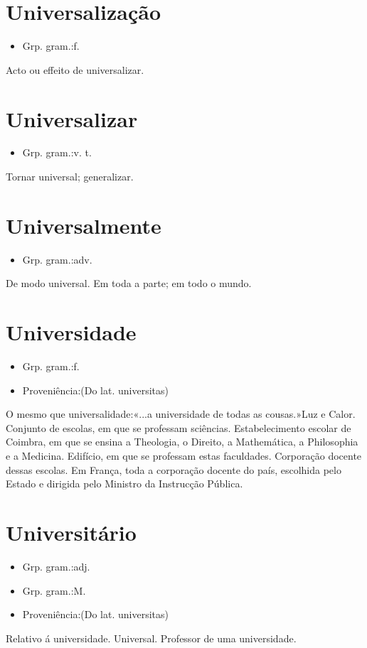 \documentclass{article}
\begin{document}
\section{Universalização}
\begin{itemize}
\item {Grp. gram.:f.}
\end{itemize}
Acto ou effeito de universalizar.
\section{Universalizar}
\begin{itemize}
\item {Grp. gram.:v. t.}
\end{itemize}
Tornar universal; generalizar.
\section{Universalmente}
\begin{itemize}
\item {Grp. gram.:adv.}
\end{itemize}
De modo universal.
Em toda a parte; em todo o mundo.
\section{Universidade}
\begin{itemize}
\item {Grp. gram.:f.}
\end{itemize}
\begin{itemize}
\item {Proveniência:(Do lat. \textunderscore universitas\textunderscore )}
\end{itemize}
O mesmo que \textunderscore universalidade\textunderscore :«\textunderscore ...a universidade de todas as cousas.\textunderscore »\textunderscore Luz e Calor\textunderscore .
Conjunto de escolas, em que se professam sciências.
Estabelecimento escolar de Coimbra, em que se ensina a Theologia, o Direito, a Mathemática, a Philosophia e a Medicina.
Edifício, em que se professam estas faculdades.
Corporação docente dessas escolas.
Em França, toda a corporação docente do país, escolhida pelo Estado e dirigida pelo Ministro da Instrucção Pública.
\section{Universitário}
\begin{itemize}
\item {Grp. gram.:adj.}
\end{itemize}
\begin{itemize}
\item {Grp. gram.:M.}
\end{itemize}
\begin{itemize}
\item {Proveniência:(Do lat. \textunderscore universitas\textunderscore )}
\end{itemize}
Relativo á universidade.
Universal.
Professor de uma universidade.
\end{document}
